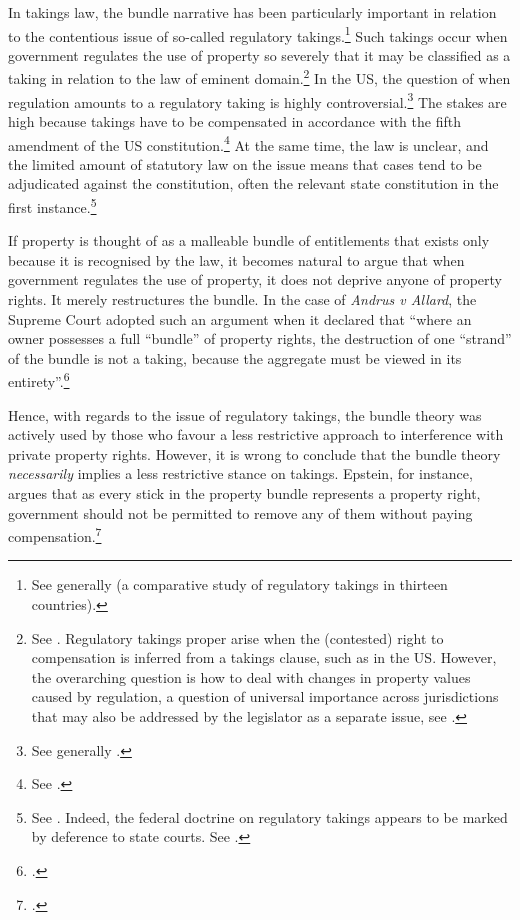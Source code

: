 In takings law, the bundle narrative has been particularly important in relation to the contentious issue of so-called regulatory takings.\footnote{See generally \cite{alterman12} (a comparative study of   regulatory takings in thirteen countries).} Such takings occur when government regulates the use of property so severely that it may be classified as a taking in relation to the law of eminent domain.\footnote{See \cite[1]{fischel95}. Regulatory takings proper arise when the (contested) right to compensation is inferred from a takings clause, such as in the US. However, the overarching question is how to deal with changes in property values caused by regulation, a question of universal importance across jurisdictions that may also be addressed by the legislator as a separate issue, see \cite[3-10]{alterman10}.} In the US, the question of when regulation amounts to a regulatory taking is highly controversial.\footnote{See generally \cite{fischel95}.} The stakes are high because takings have to be compensated in accordance with the fifth amendment of the US constitution.\footnote{See \cite{fifth}.} At the same time, the law is unclear, and the limited amount of statutory law on the issue means that cases tend to be adjudicated against the constitution, often the relevant state constitution in the first instance.\footnote{See \cite[31-32]{alterman10}. Indeed, the federal doctrine on regulatory takings appears to be marked by deference to state courts. See \cite[66]{fischel95}.}

If property is thought of as a malleable bundle of entitlements that exists only because it is recognised by the law, it becomes natural to argue that when government regulates the use of property, it does not deprive anyone of property rights. It merely restructures the bundle. In the case of {\it Andrus v Allard}, the Supreme Court adopted such an argument when it declared that ``where an owner possesses a full ``bundle'' of property rights, the destruction of one ``strand'' of the bundle is not a taking, because the aggregate must be viewed in its entirety''.\footcite[65--66]{andrus79}

Hence, with regards to the issue of regulatory takings, the bundle theory was actively used by those who favour a less restrictive approach to interference with private property rights. However, it is wrong to conclude that the bundle theory {\it necessarily} implies a less restrictive stance on takings. Epstein, for instance, argues that as every stick in the property bundle represents a property right, government should not be permitted to remove any of them without paying compensation.\footcite[232-233]{epstein11} 

